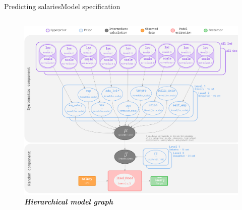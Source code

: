 \documentclass[aspectratio=169, xcolor=dvipsnames]{beamer}
\begin{document}
\begin{frame}{Predicting salaries}{Model specification}
\begin{columns}
\begin{figure}
                \includegraphics[width=1.07\textwidth]{./images/hierarchical_graph.png}
                \captionsetup{labelformat=empty}
                \setlength{\abovecaptionskip}{-10pt}
                \caption{\fontsize{8pt}{8pt}\selectfont \textbf{\textit{Hierarchical model graph}}}
            \end{figure}
    \end{columns}
\end{frame}
\end{document}

